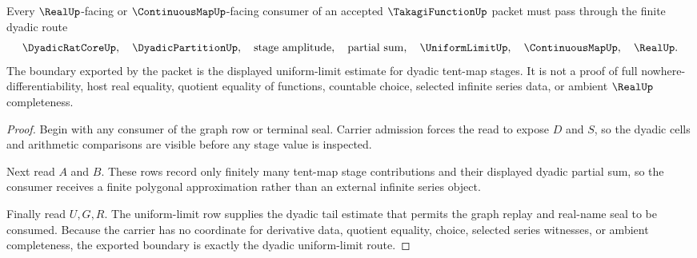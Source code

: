 \begin{theorem}
\label{thm:takagi-function-dyadic-uniform-limit-boundary}
Every $\RealUp$-facing or $\ContinuousMapUp$-facing consumer of an accepted $\TakagiFunctionUp$ packet must pass through the finite dyadic route
$$
\DyadicRatCoreUp,\quad
\DyadicPartitionUp,\quad
\mathrm{stage\ amplitude},\quad
\mathrm{partial\ sum},\quad
\UniformLimitUp,\quad
\ContinuousMapUp,\quad
\RealUp .
$$
The boundary exported by the packet is the displayed uniform-limit estimate for dyadic tent-map stages. It is not a proof of full nowhere-differentiability, host real equality, quotient equality of functions, countable choice, selected infinite series data, or ambient $\RealUp$ completeness.
\end{theorem}
\begin{proof}
Begin with any consumer of the graph row or terminal seal. Carrier admission forces the read to expose $D$ and $S$, so the dyadic cells and arithmetic comparisons are visible before any stage value is inspected.

Next read $A$ and $B$. These rows record only finitely many tent-map stage contributions and their displayed dyadic partial sum, so the consumer receives a finite polygonal approximation rather than an external infinite series object.

Finally read $U,G,R$. The uniform-limit row supplies the dyadic tail estimate that permits the graph replay and real-name seal to be consumed. Because the carrier has no coordinate for derivative data, quotient equality, choice, selected series witnesses, or ambient completeness, the exported boundary is exactly the dyadic uniform-limit route.
\end{proof}



